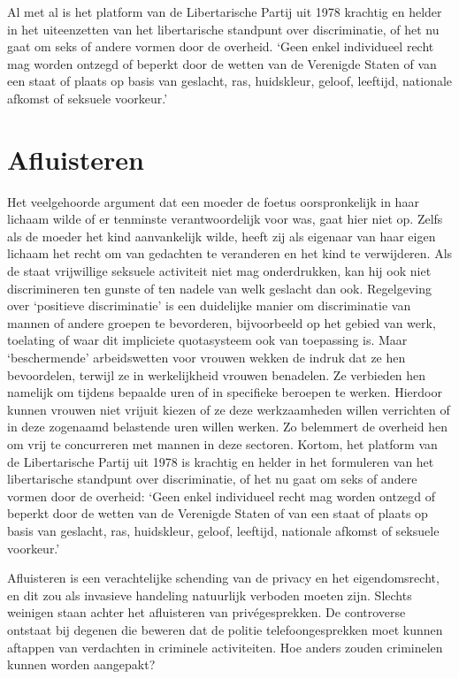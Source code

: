 \documentclass[
  a5paper,
  smalldemyvopaper,10pt,twoside,onecolumn,openright,extrafontsizes,hidelinks]{memoir}
\begin{document}
Al met al is het platform van de Libertarische Partij uit 1978 krachtig
en helder in het uiteenzetten van het libertarische standpunt over
discriminatie, of het nu gaat om seks of andere vormen door de overheid.
`Geen enkel individueel recht mag worden ontzegd of beperkt door de
wetten van de Verenigde Staten of van een staat of plaats op basis van
geslacht, ras, huidskleur, geloof, leeftijd, nationale afkomst of
seksuele voorkeur.'

\section{Afluisteren}\label{afluisteren}

Het veelgehoorde argument dat een moeder de foetus oorspronkelijk in
haar lichaam wilde of er tenminste verantwoordelijk voor was, gaat hier
niet op. Zelfs als de moeder het kind aanvankelijk wilde, heeft zij als
eigenaar van haar eigen lichaam het recht om van gedachten te veranderen
en het kind te verwijderen. Als de staat vrijwillige seksuele activiteit
niet mag onderdrukken, kan hij ook niet discrimineren ten gunste of ten
nadele van welk geslacht dan ook. Regelgeving over `positieve
discriminatie' is een duidelijke manier om discriminatie van mannen of
andere groepen te bevorderen, bijvoorbeeld op het gebied van werk,
toelating of waar dit impliciete quotasysteem ook van toepassing is.
Maar `beschermende' arbeidswetten voor vrouwen wekken de indruk dat ze
hen bevoordelen, terwijl ze in werkelijkheid vrouwen benadelen. Ze
verbieden hen namelijk om tijdens bepaalde uren of in specifieke
beroepen te werken. Hierdoor kunnen vrouwen niet vrijuit kiezen of ze
deze werkzaamheden willen verrichten of in deze zogenaamd belastende
uren willen werken. Zo belemmert de overheid hen om vrij te concurreren
met mannen in deze sectoren. Kortom, het platform van de Libertarische
Partij uit 1978 is krachtig en helder in het formuleren van het
libertarische standpunt over discriminatie, of het nu gaat om seks of
andere vormen door de overheid: `Geen enkel individueel recht mag worden
ontzegd of beperkt door de wetten van de Verenigde Staten of van een
staat of plaats op basis van geslacht, ras, huidskleur, geloof,
leeftijd, nationale afkomst of seksuele voorkeur.'

Afluisteren is een verachtelijke schending van de privacy en het
eigendomsrecht, en dit zou als invasieve handeling natuurlijk verboden
moeten zijn. Slechts weinigen staan achter het afluisteren van
privégesprekken. De controverse ontstaat bij degenen die beweren dat de
politie telefoongesprekken moet kunnen aftappen van verdachten in
criminele activiteiten. Hoe anders zouden criminelen kunnen worden
aangepakt?
\end{document}
